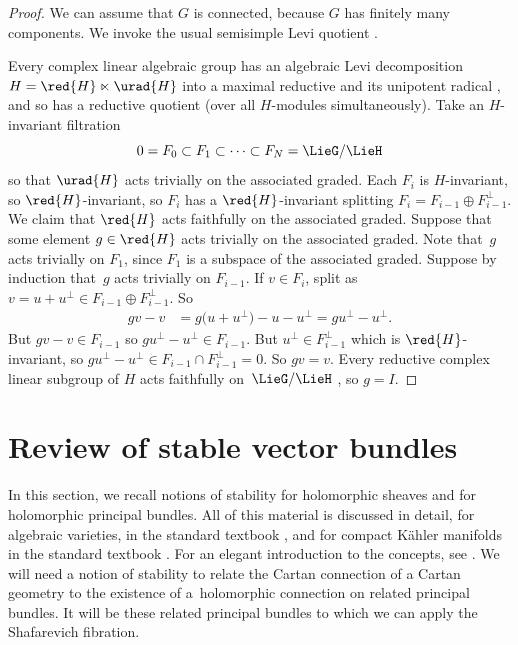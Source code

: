 \documentclass[pdftex]{sigma}
\numberwithin{equation}{section}
\begin{document}
\begin{proof}
We can assume that $G$ is connected, because $G$ has finitely many components.
We invoke the usual semisimple Levi quotient \cite[p. 20]{Vinberg:1994}.

Every complex linear algebraic group has an algebraic Levi decomposition $H = \red{H} \ltimes \urad{H}$ into a maximal reductive and its unipotent radical \cite[Theorem 4.3]{Hochschild:1981}, and so has a reductive quotient (over all $H$-modules simultaneously).
Take an $H$-invariant filtration \[0 = F_0 \subset F_1 \subset \cdots
 \subset F_N = \LieG/\LieH\] so that $\urad{H}$ acts trivially on the associated graded.
Each $F_i$ is $H$-invariant, so $\red{H}$-invariant, so $F_i$ has a $\red{H}$-invariant splitting $F_i=F_{i-1} \oplus F_{i-1}^{\perp}$.
We claim that $\red{H}$ acts faithfully on the associated graded.
Suppose that some element $g \in \red{H}$ acts trivially on the associated graded.
Note that~$g$ acts trivially on $F_1$, since $F_1$ is a subspace of the associated graded.
Suppose by induction that~$g$ acts trivially on $F_{i-1}$.
If $v \in F_i$, split as $v=u+u^{\perp}\in F_{i-1}\oplus F_{i-1}^{\perp}$.
So
\begin{align*}
gv-v
&=
g\bigl(u+u^{\perp}\bigr)-u-u^{\perp}=
gu^{\perp}-u^{\perp}.
\end{align*}
But $gv-v \in F_{i-1}$ so $gu^{\perp}-u^{\perp} \in F_{i-1}$.
But $u^{\perp} \in F_{i-1}^{\perp}$ which is $\red{H}$-invariant, so $gu^{\perp}-u^{\perp} \in F_{i-1} \cap F_{i-1}^{\perp}=0$.
So $gv = v$.
Every reductive complex linear subgroup of $H$ acts faithfully on~$\LieG/\LieH$ \cite[Lemma~6.1]{McKay2013}, so $g = I$.
\end{proof}

\section{Review of stable vector bundles}\label{section:stability}

In this section, we recall notions of stability for holomorphic sheaves and for holomorphic principal bundles.
All of this material is discussed in detail, for algebraic varieties, in the standard textbook \cite[Chapter 1]{Huybrechts/Lehn:2010}, and for compact K\"ahler manifolds in the standard textbook \cite[Chapter V, Section 7]{Kobayashi:1987}.
For an elegant introduction to the concepts, see \cite[Chapter 7]{Atiyah.Bott:1983}. We will need a notion of stability to relate the Cartan connection of a Cartan
geometry to the existence of a~holomorphic connection on related principal bundles. It will be these
related principal bundles to which we can apply the Shafarevich fibration.
\end{document}
